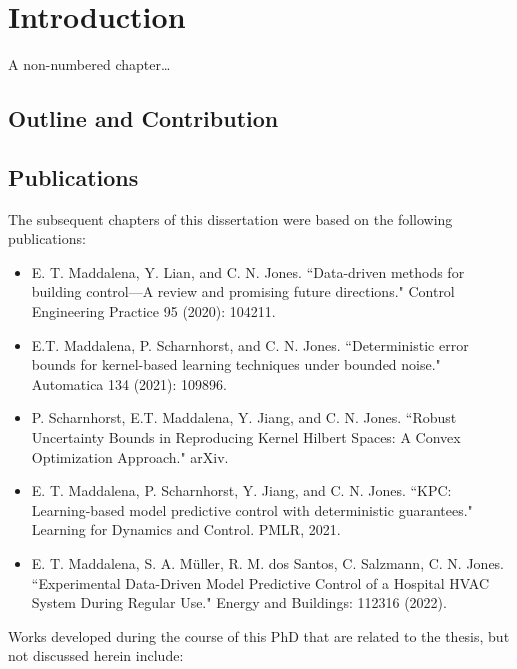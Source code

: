 \cleardoublepage
\chapter*{Introduction}
A non-numbered chapter\dots

\section{Outline and Contribution}

\section{Publications}

The subsequent chapters of this dissertation were based on the following publications:

\begin{itemize}
	\item E. T. Maddalena, Y. Lian, and C. N. Jones. ``Data-driven methods for building control—A review and promising future directions." Control Engineering Practice 95 (2020): 104211.
	
	\item E.T. Maddalena, P. Scharnhorst, and C. N. Jones. ``Deterministic error bounds for kernel-based learning techniques under bounded noise." Automatica 134 (2021): 109896.
	
	\item P. Scharnhorst, E.T. Maddalena, Y. Jiang, and C. N. Jones. ``Robust Uncertainty Bounds in Reproducing Kernel Hilbert Spaces: A Convex Optimization Approach." arXiv.
	
	\item E. T. Maddalena, P. Scharnhorst, Y. Jiang, and C. N. Jones. ``KPC: Learning-based model predictive control with deterministic guarantees." Learning for Dynamics and Control. PMLR, 2021.

	\item E. T. Maddalena, S. A. Müller, R. M. dos Santos, C. Salzmann, C. N. Jones. ``Experimental Data-Driven Model Predictive Control of a Hospital HVAC System During Regular Use." Energy and Buildings: 112316 (2022).
	
\end{itemize}

Works developed during the course of this PhD that are related to the thesis, but not discussed herein include:

